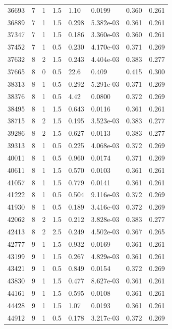 \documentclass[preview]{standalone}
\begin{document}
{{{\begin{tabular}{L{1.2cm}C{1.2cm} C{0.3cm}C{0.5cm} C{1.4cm}C{1.4cm} C{1.4cm}C{1.4cm}}
  36693  &     7  & 1     & 1.5 &  1.10  & 0.0199  & 0.360 &  0.261   \\ 
  36889  &     7  & 1     & 1.5 &  0.298  & 5.382e-03  & 0.361 &  0.261   \\ 
  37347  &     7  & 1     & 1.5 &  0.186  & 3.360e-03  & 0.360 &  0.261   \\ 
  37452  &     7  & 1     & 0.5 &  0.230  & 4.170e-03  & 0.371 &  0.269   \\ 
  37632  &     8  & 2     & 1.5 &  0.243  & 4.404e-03  & 0.383 &  0.277   \\ 
  37665  &     8  & 0     & 0.5 &  22.6  & 0.409  & 0.415 &  0.300   \\ 
  38313  &     8  & 1     & 0.5 &  0.292  & 5.291e-03  & 0.371 &  0.269   \\ 
  38376  &     8  & 1     & 0.5 &  4.42  & 0.0800  & 0.372 &  0.269   \\ 
  38495  &     8  & 1     & 1.5 &  0.643  & 0.0116  & 0.361 &  0.261   \\ 
  38715  &     8  & 2     & 1.5 &  0.195  & 3.523e-03  & 0.383 &  0.277   \\ 
  39286  &     8  & 2     & 1.5 &  0.627  & 0.0113  & 0.383 &  0.277   \\ 
  39313  &     8  & 1     & 0.5 &  0.225  & 4.068e-03  & 0.372 &  0.269   \\ 
  40011  &     8  & 1     & 0.5 &  0.960  & 0.0174  & 0.371 &  0.269   \\ 
  40611  &     8  & 1     & 1.5 &  0.570  & 0.0103  & 0.361 &  0.261   \\ 
  41057  &     8  & 1     & 1.5 &  0.779  & 0.0141  & 0.361 &  0.261   \\ 
  41222  &     8  & 1     & 0.5 &  0.504  & 9.116e-03  & 0.372 &  0.269   \\ 
  41930  &     8  & 1     & 0.5 &  0.189  & 3.416e-03  & 0.372 &  0.269   \\ 
  42062  &     8  & 2     & 1.5 &  0.212  & 3.828e-03  & 0.383 &  0.277   \\ 
  42413  &     8  & 2     & 2.5 &  0.249  & 4.502e-03  & 0.367 &  0.265   \\ 
  42777  &     9  & 1     & 1.5 &  0.932  & 0.0169  & 0.361 &  0.261   \\ 
  43199  &     9  & 1     & 1.5 &  0.267  & 4.829e-03  & 0.361 &  0.261   \\ 
  43421  &     9  & 1     & 0.5 &  0.849  & 0.0154  & 0.372 &  0.269   \\ 
  43830  &     9  & 1     & 1.5 &  0.477  & 8.627e-03  & 0.361 &  0.261   \\ 
  44161  &     9  & 1     & 1.5 &  0.595  & 0.0108  & 0.361 &  0.261   \\ 
  44428  &     9  & 1     & 1.5 &  1.07  & 0.0193  & 0.361 &  0.261   \\ 
  44912  &     9  & 1     & 0.5 &  0.178  & 3.217e-03  & 0.372 &  0.269   \\ 
\hline 
\end{tabular} 

}}}
\end{document}

